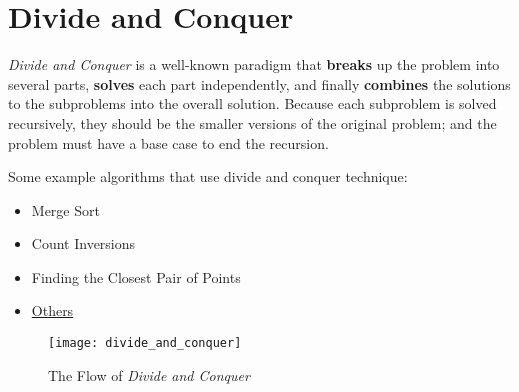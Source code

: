 \documentclass[12pt]{article}
\begin{document}
\cleardoublepage

	\section{Divide and Conquer}

\textit{Divide and Conquer} is a well-known paradigm that \textbf{breaks} up the problem into several parts, \textbf{solves} each part independently, and finally \textbf{combines} the solutions to the subproblems into the overall solution. Because each subproblem is solved recursively, they should be the smaller versions of the original problem; and the problem must have a base case to end the recursion. 

Some example algorithms that use divide and conquer technique: 
\begin{itemize}
	\item Merge Sort
	\item Count Inversions
	\item Finding the Closest Pair of Points 
	\item \href{https://www.geeksforgeeks.org/divide-and-conquer/}{Others}
\end{itemize}	

\begin{figure}[h]
	\centering
	\texttt{[image: divide\_and\_conquer]}
	\caption{The Flow of \textit{Divide and Conquer}}
	\label{fig:divide_and_conquer}
\end{figure}
\end{document}

